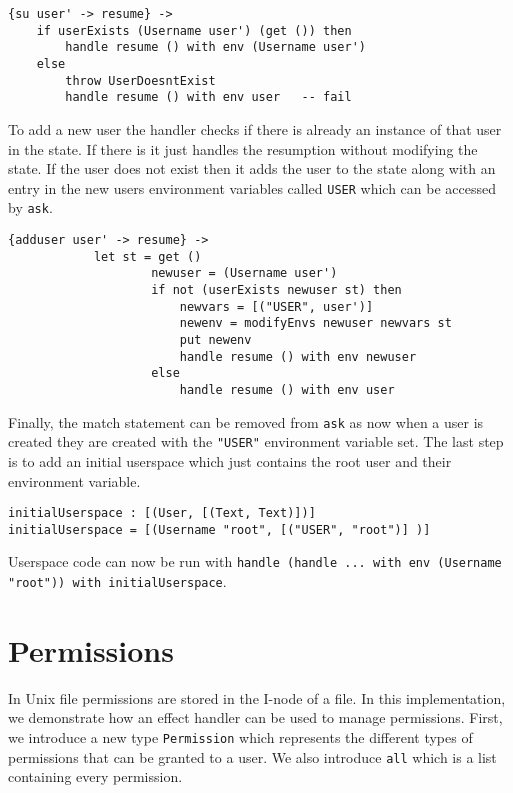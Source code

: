\documentclass[logo,bsc,singlespacing,parskip]{infthesis}
\begin{document}
\begin{lstlisting}[language=unison]
{su user' -> resume} -> 
    if userExists (Username user') (get ()) then
        handle resume () with env (Username user')
    else 
        throw UserDoesntExist
        handle resume () with env user   -- fail
\end{lstlisting}

To add a new user the handler checks if there is already an instance of that
user in the state. If there is it just handles the resumption without modifying
the state. If the user does not exist then it adds the user to the state along
with an entry in the new users environment variables called \texttt{USER} which
can be accessed by \texttt{ask}.

\begin{lstlisting}[language=unison]
{adduser user' -> resume} ->
            let st = get ()
                    newuser = (Username user')
                    if not (userExists newuser st) then
                        newvars = [("USER", user')]
                        newenv = modifyEnvs newuser newvars st
                        put newenv
                        handle resume () with env newuser
                    else 
                        handle resume () with env user

\end{lstlisting}

Finally, the match statement can be removed from \texttt{ask} as now when a user is created they are created with the \texttt{"USER"} environment variable set. The last step is to add an initial userspace which just contains the root user and their environment variable.

\begin{lstlisting}[language=unison]
initialUserspace : [(User, [(Text, Text)])]
initialUserspace = [(Username "root", [("USER", "root")] )]
\end{lstlisting}

Userspace code can now be run with \texttt{handle (handle ... with env (Username "root")) with initialUserspace}.


\section{Permissions}
\label{permissions}

In Unix file permissions are stored in the I-node of a file.
In this implementation, we demonstrate how an effect handler can be used to manage permissions.
First, we introduce a new type \texttt{Permission} which represents the different types of permissions that can be granted to a user. We also introduce \texttt{all} which is a list containing every permission.
\end{document}
